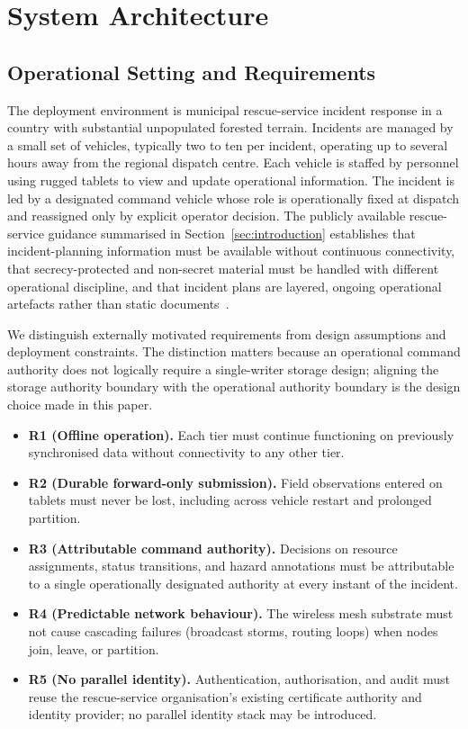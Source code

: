 \section{System Architecture}
\label{sec:architecture}

\subsection{Operational Setting and Requirements}
\label{sec:requirements}

The deployment environment is municipal rescue-service incident response in a country with substantial unpopulated forested terrain. Incidents are managed by a small set of vehicles, typically two to ten per incident, operating up to several hours away from the regional dispatch centre. Each vehicle is staffed by personnel using rugged tablets to view and update operational information. The incident is led by a designated command vehicle whose role is operationally fixed at dispatch and reassigned only by explicit operator decision. The publicly available rescue-service guidance summarised in Section~\ref{sec:introduction} establishes that incident-planning information must be available without continuous connectivity, that secrecy-protected and non-secret material must be handled with different operational discipline, and that incident plans are layered, ongoing operational artefacts rather than static documents~\cite{rsg-rad201, rsg-kommunalplan}.

We distinguish externally motivated requirements from design assumptions and deployment constraints. The distinction matters because an operational command authority does not logically require a single-writer storage design; aligning the storage authority boundary with the operational authority boundary is the design choice made in this paper.

\begin{itemize}
  \item \textbf{R1 (Offline operation).} Each tier must continue functioning on previously synchronised data without connectivity to any other tier.
  \item \textbf{R2 (Durable forward-only submission).} Field observations entered on tablets must never be lost, including across vehicle restart and prolonged partition.
  \item \textbf{R3 (Attributable command authority).} Decisions on resource assignments, status transitions, and hazard annotations must be attributable to a single operationally designated authority at every instant of the incident.
  \item \textbf{R4 (Predictable network behaviour).} The wireless mesh substrate must not cause cascading failures (broadcast storms, routing loops) when nodes join, leave, or partition.
  \item \textbf{R5 (No parallel identity).} Authentication, authorisation, and audit must reuse the rescue-service organisation's existing certificate authority and identity provider; no parallel identity stack may be introduced.
\end{itemize}

